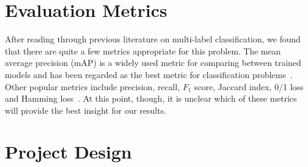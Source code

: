 \documentclass[10pt, a4paper, twocolumn]{article} %
\begin{document}
\section{Evaluation Metrics\label{sec:6}} %


After reading through previous literature on multi-label classification, we found that there are quite a few metrics appropriate for this problem. The mean average precision (mAP) is a widely used metric for comparing between trained models and has been regarded as the best metric for classification problems~\cite{Lavrenko_2014}.  Other popular metrics include precision, recall, $F_1$ score, Jaccard index, 0/1 loss and Hamming loss~\cite{Tsoumakas:2007,SOKOLOVA2009427,Herrera:2016}. At this point, though, it is unclear which of these metrics will provide the best insight for our results.


\section{Project Design\label{sec:7}} %

\end{document}
